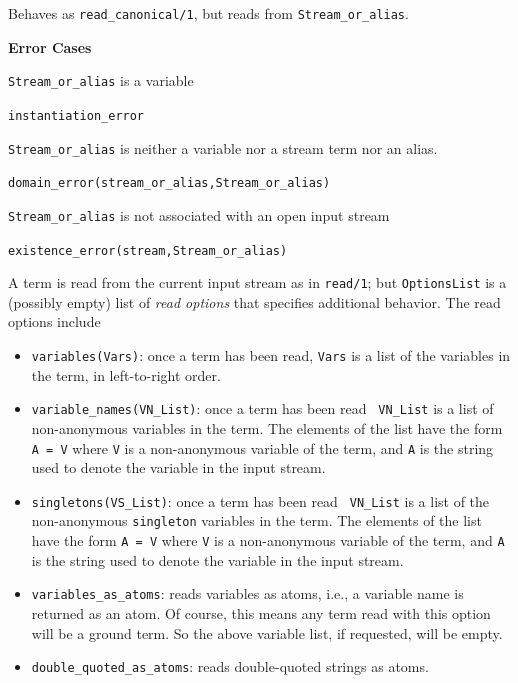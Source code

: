 \begin{description}

Behaves as {\tt read\_canonical/1}, but reads from {\tt Stream\_or\_alias}.

{\bf Error Cases}
\bi
\item 	{\tt Stream\_or\_alias} is a variable
\bi
\item {\tt instantiation\_error}
\ei
\item 	{\tt Stream\_or\_alias} is neither a variable nor a stream term nor an alias.
\bi
\item 	{\tt domain\_error(stream\_or\_alias,Stream\_or\_alias)}
\ei
\item 	{\tt Stream\_or\_alias} is not associated with an open input stream
\bi
\item 	{\tt existence\_error(stream,Stream\_or\_alias)}
\ei
\ei

%
A term is read from the current input stream as in {\tt read/1}; but
{\tt OptionsList} is a (possibly empty) list of {\em read options}
that specifies additional behavior.  The read options include
\begin{itemize}
\item {\tt variables(Vars)}: once a term has been read, {\tt Vars} is a
list of the variables in the term, in left-to-right order. 
\item {\tt variable\_names(VN\_List)}: once a term has been read {\tt
VN\_List} is a list of non-anonymous variables in the term.  The
elements of the list have the form {\tt A = V} where {\tt V} is a
non-anonymous variable of the term, and {\tt A} is the string used to
denote the variable in the input stream.
\item {\tt singletons(VS\_List)}: once a term has been read {\tt
VN\_List} is a list of the non-anonymous {\tt singleton} variables in
the term.  The elements of the list have the form {\tt A = V} where
{\tt V} is a non-anonymous variable of the term, and {\tt A} is the
string used to denote the variable in the input stream.
\item {\tt variables\_as\_atoms}: reads variables as atoms, i.e., a
  variable name is returned as an atom.  Of course, this means any
  term read with this option will be a ground term.  So the above
  variable list, if requested, will be empty.
\item {\tt double\_quoted\_as\_atoms}: reads double-quoted strings as
  atoms.
\end{itemize}


\end{description}
